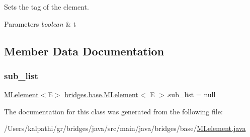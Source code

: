 Sets the tag of the element.


\begin{DoxyParams}{Parameters}
{\em boolean} & t \\
\hline
\end{DoxyParams}


\subsection{Member Data Documentation}
\mbox{\label{classbridges_1_1base_1_1_m_lelement_a7dee2985f9a8134d3076eb9478422403}} 
\subsubsection{\texorpdfstring{sub\_list}{sub\_list}}
{\footnotesize\ttfamily \mbox{\hyperlink{classbridges_1_1base_1_1_m_lelement}{M\+Lelement}}$<$E$>$ \mbox{\hyperlink{classbridges_1_1base_1_1_m_lelement}{bridges.\+base.\+M\+Lelement}}$<$ E $>$.sub\+\_\+list = null\hspace{0.3cm}{\ttfamily [protected]}}



The documentation for this class was generated from the following file\+:\begin{DoxyCompactItemize}
\item 
/\+Users/kalpathi/gr/bridges/java/src/main/java/bridges/base/\mbox{\hyperlink{_m_lelement_8java}{M\+Lelement.\+java}}\end{DoxyCompactItemize}
